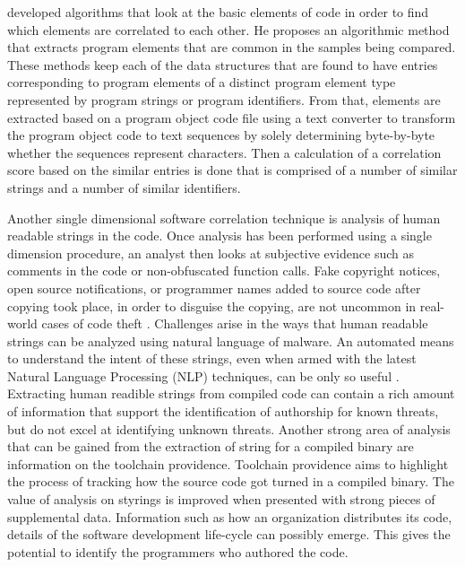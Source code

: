 \documentclass[12pt]{report}
\begin{document}
\cite{zeidman2012detecting} developed algorithms that look at the basic elements of code in order to find which elements are correlated to each other.  He proposes an algorithmic method that extracts program elements that are common in the samples being compared.  These methods keep each of the data structures that are found to have entries corresponding to program elements of a distinct program element type represented by program strings or program identifiers.   From that, elements are extracted based on a program object code file using a text converter to transform the program object code to text sequences by solely determining byte-by-byte whether the sequences represent characters.  Then a calculation of a correlation score based on the similar entries is done that is comprised of a number of similar strings and a number of similar identifiers.

Another single dimensional software correlation technique is analysis of human readable strings in the code.  Once analysis has been performed using a single dimension procedure, an analyst then looks at subjective evidence such as comments in the code or non-obfuscated function calls.  Fake copyright notices, open source notifications, or programmer names added to source code after copying took place, in order to disguise the copying, are not uncommon in real-world cases of code theft \cite{sfbook:2011}.  Challenges arise in the ways that human readable strings can be analyzed using natural language of malware.  An automated means to understand the intent of these strings, even when armed with the latest Natural Language Processing (NLP) techniques, can be only so useful \cite{artsci:2015}.  Extracting human readible strings from compiled code can contain a rich amount of information that support the identification of authorship for known threats, but do not excel at identifying unknown threats.  Another strong area of analysis that can be gained from the extraction of string for a compiled binary are information on the toolchain providence.  Toolchain providence aims to highlight the process of tracking how the source code got turned in a compiled binary.  The value of analysis on styrings is improved when presented with strong pieces of supplemental data.  Information such as how an organization distributes its code, details of the software development life-cycle can possibly emerge.  This gives the potential to identify the programmers who authored the code.  
\end{document}
